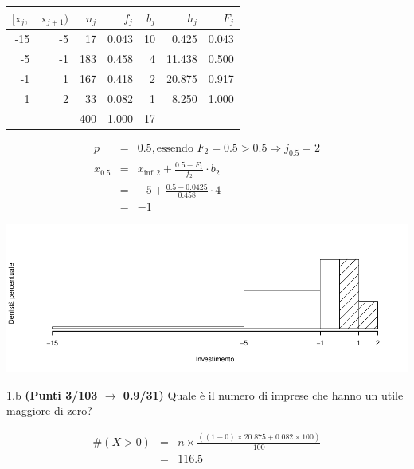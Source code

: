 \documentclass[
  11pt,
]{book}
\theoremstyle{mytheoremstyle}
\theoremstyle{mydefstyle}
\newenvironment{sol}
  {
  \begin{tcolorbox}[enhanced,breakable,arc=0.1mm,boxrule=1pt,colback=white,colframe=iblue,
  title=\bf \fontfamily{lmss}\selectfont \hspace{.5 cm} Soluzione,drop fuzzy shadow]

}{
\end{tcolorbox}
  }
\begin{document}
\begin{sol}

\begin{table}[H]
\centering
\begin{tabular}{rrrrrrr}
\toprule
$[\text{x}_j,$ & $\text{x}_{j+1})$ & $n_j$ & $f_j$ & $b_j$ & $h_j$ & $F_j$\\
\midrule
-15 & -5 & 17 & 0.043 & 10 & 0.425 & 0.043\\
-5 & -1 & 183 & 0.458 & 4 & 11.438 & 0.500\\
-1 & 1 & 167 & 0.418 & 2 & 20.875 & 0.917\\
1 & 2 & 33 & 0.082 & 1 & 8.250 & 1.000\\
 &  & 400 & 1.000 & 17 &  & \\
\bottomrule
\end{tabular}
\end{table}

\begin{eqnarray*}
  p &=&  0.5 , \text{essendo }F_{ 2 }= 0.5  > 0.5  \Rightarrow j_{ 0.5 }= 2 \\
  x_{ 0.5 } &=& x_{\text{inf}; 2 } + \frac{ { 0.5 } - F_{ 1 }} {f_{ 2 }} \cdot b_{ 2 } \\
            &=&  -5  + \frac {{ 0.5 } -  0.0425 } { 0.458 } \cdot  4  \\
            &=&  -1 
\end{eqnarray*}

\begin{center}\includegraphics{Esami_passati_con_soluzioni_files/figure-latex/2023-20,-1} \end{center}

\end{sol}

1.b \textbf{(Punti 3/103 \(\rightarrow\) 0.9/31)} Quale è il numero di imprese che hanno un utile maggiore di zero?

\begin{sol}
\begin{eqnarray*}
  \#(X>0) &=& n\times \frac{((1-0)\times 20.875+0.082\times 100)}{100}\\
   &=& 116.5
\end{eqnarray*}

\end{sol}
\end{document}
